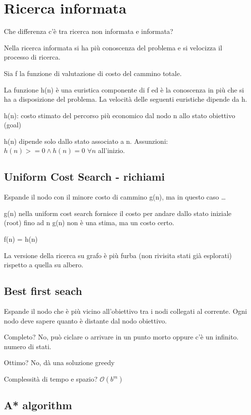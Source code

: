 \newpage

\section{Ricerca informata}

Che differenza c'è tra ricerca non informata e informata?

Nella ricerca informata si ha più conoscenza del problema e si
velocizza il processo di ricerca.

Sia f la funzione di valutazione di costo del cammino totale.

La funzione h(n) è una euristica componente di f ed è la
conoscenza in più che si ha a disposizione del problema. La
velocità delle seguenti euristiche dipende da h.

h(n): costo stimato del percorso più economico dal nodo n allo stato
obiettivo (goal)

h(n) dipende solo dallo stato associato a n.
Assunzioni: $h(n) >= 0 \land h(n) = 0$ $\forall n$ all'inizio.

\subsection{Uniform Cost Search - richiami}
Espande il nodo con il minore costo di cammino g(n), ma in questo caso \dots

g(n) nella uniform cost search fornisce il costo per andare dallo stato
iniziale (root) fino ad n g(n) non è una stima, ma un costo certo.

f(n) = h(n)

La versione della ricerca su grafo è più furba (non rivisita stati già esplorati)
rispetto a quella su albero. 

\subsection{Best first seach}
Espande il nodo che è più vicino all'obiettivo tra i nodi collegati al corrente.
Ogni nodo deve sapere quanto è distante dal nodo obiettivo.

Completo? No, può ciclare o arrivare in un punto morto oppure c'è un infinito.
numero di stati.

Ottimo? No, dà una soluzione greedy

Complessità di tempo e spazio? $\mathcal{O}(b^m)$

\subsection{A* algorithm}

